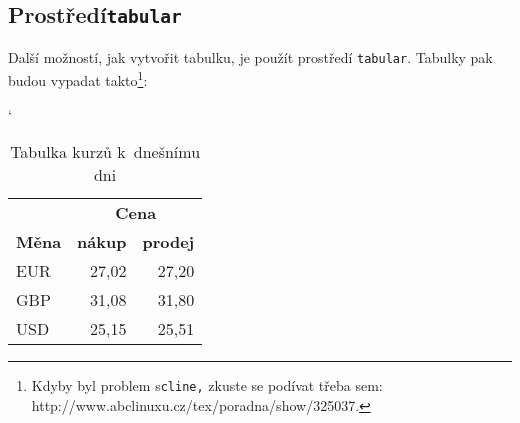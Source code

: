 \documentclass[a4paper, 11pt]{article}
\begin{document}
\subsection{Prostředí\hspace{0.6em}\texttt{tabular}}
Další možností, jak vytvořit tabulku, je použít prostředí\hspace{0.3em} \texttt{tabular}. Tabulky pak budou vypadat takto\footnote{Kdyby byl problem s\hspace{0.6em}\texttt{cline,} zkuste se podívat třeba sem: http://www.abclinuxu.cz/tex/poradna/show/325037.}:\bigskip
\begin{table}[h]
\begin{center}
\catcode` %
\begin{tabular}{|l|r|r|} \hline 
	& \multicolumn{2}{|c|}{\textbf{Cena}}\\ \cline{2-3}
	\textbf{Měna} & \textbf{nákup} & \textbf{prodej}\\ \hline
EUR & 27,02 & 27,20 \\
GBP & 31,08 & 31,80 \\
USD & 25,15 & 25,51 \\ \hline
\end{tabular}
\caption{Tabulka kurzů k~dnešnímu dni}
\label{money}
\end{center}
\end{table}
\end{document}
